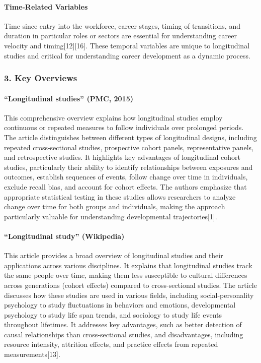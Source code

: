 \documentclass[./main.tex]{subfiles}
\begin{document}
\paragraph{Time-Related Variables}\label{time-related-variables}

Time since entry into the workforce, career stages, timing of
transitions, and duration in particular roles or sectors are essential
for understanding career velocity and timing{[}12{]}{[}16{]}. These
temporal variables are unique to longitudinal studies and critical for
understanding career development as a dynamic process.

\subsubsection{3. Key Overviews}\label{key-overviews}

\paragraph{``Longitudinal studies'' (PMC,
2015)}\label{longitudinal-studies-pmc-2015}

This comprehensive overview explains how longitudinal studies employ
continuous or repeated measures to follow individuals over prolonged
periods. The article distinguishes between different types of
longitudinal designs, including repeated cross-sectional studies,
prospective cohort panels, representative panels, and retrospective
studies. It highlights key advantages of longitudinal cohort studies,
particularly their ability to identify relationships between exposures
and outcomes, establish sequences of events, follow change over time in
individuals, exclude recall bias, and account for cohort effects. The
authors emphasize that appropriate statistical testing in these studies
allows researchers to analyze change over time for both groups and
individuals, making the approach particularly valuable for understanding
developmental trajectories{[}1{]}.

\paragraph{``Longitudinal study''
(Wikipedia)}\label{longitudinal-study-wikipedia}

This article provides a broad overview of longitudinal studies and their
applications across various disciplines. It explains that longitudinal
studies track the same people over time, making them less susceptible to
cultural differences across generations (cohort effects) compared to
cross-sectional studies. The article discusses how these studies are
used in various fields, including social-personality psychology to study
fluctuations in behaviors and emotions, developmental psychology to
study life span trends, and sociology to study life events throughout
lifetimes. It addresses key advantages, such as better detection of
causal relationships than cross-sectional studies, and disadvantages,
including resource intensity, attrition effects, and practice effects
from repeated measurements{[}13{]}.
\end{document}

